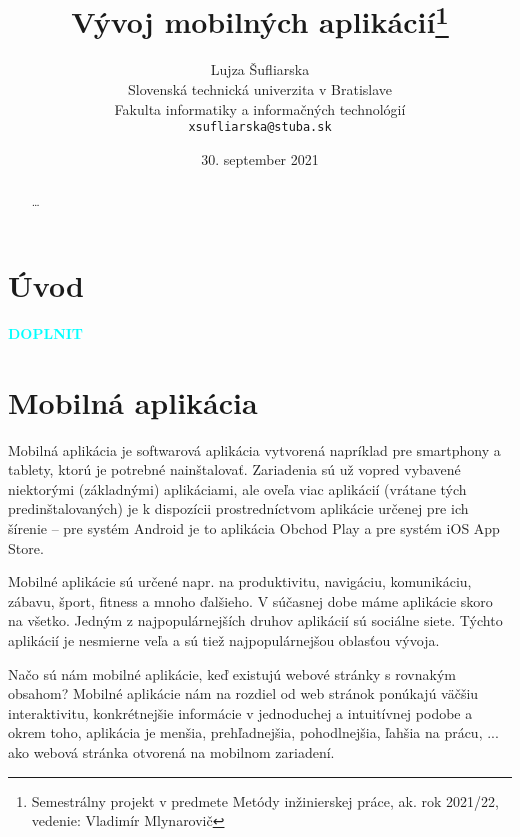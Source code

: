 \documentclass[10pt,twoside,slovak,a4paper]{article}
\title{Vývoj mobilných aplikácií\thanks{Semestrálny projekt v predmete Metódy inžinierskej práce, ak. rok 2021/22, vedenie: Vladimír Mlynarovič}} %
\author{Lujza Šufliarska\\[2pt]
	{\small Slovenská technická univerzita v Bratislave}\\
	{\small Fakulta informatiky a informačných technológií}\\
	{\small \texttt{xsufliarska@stuba.sk}}
	}
\date{\small 30. september 2021} %
\begin{document}
\maketitle

\begin{abstract}

\ldots
\end{abstract}



\section{Úvod}



\vspace{1.5cm}
\textcolor{cyan}{{\textbf{\huge DOPLNIT}}}
\vspace{1.5cm}







\section{Mobilná aplikácia}
\quad Mobilná aplikácia je softwarová aplikácia vytvorená napríklad pre smartphony a tablety, ktorú je potrebné nainštalovať. Zariadenia sú už vopred vybavené niektorými (základnými) aplikáciami, ale oveľa viac aplikácií (vrátane tých predinštalovaných) je k dispozícii prostredníctvom aplikácie určenej pre ich šírenie – pre systém Android je to aplikácia Obchod Play a pre systém iOS App Store.

Mobilné aplikácie sú určené napr. na produktivitu, navigáciu, komunikáciu, zábavu, šport, fitness a mnoho ďalšieho. V súčasnej dobe máme aplikácie skoro na všetko. Jedným z najpopulárnejších druhov aplikácií sú sociálne siete. Týchto aplikácií je nesmierne veľa a sú tiež najpopulárnejšou oblasťou vývoja.

Načo sú nám mobilné aplikácie, keď existujú webové stránky s rovnakým obsahom? Mobilné aplikácie nám na rozdiel od web stránok ponúkajú väčšiu interaktivitu, konkrétnejšie informácie v jednoduchej a intuitívnej podobe a okrem toho, aplikácia je menšia, prehľadnejšia, pohodlnejšia, ľahšia na prácu, ... ako webová stránka otvorená na mobilnom zariadení.	\cite{eYewated1, eliteml, amazon}
\end{document}
